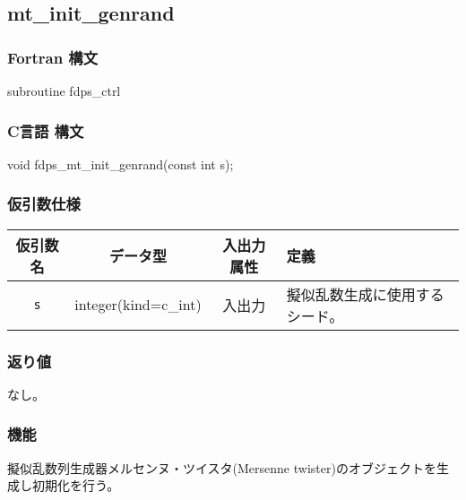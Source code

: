 \subsection{mt\_init\_genrand}
\subsubsection*{Fortran 構文}
\begin{screen}
\begin{spverbatim}
subroutine fdps_ctrl%
\end{spverbatim}
\end{screen}

\subsubsection*{C言語 構文}
\begin{screen}
\begin{spverbatim}
void fdps_mt_init_genrand(const int s);
\end{spverbatim}
\end{screen}

\subsubsection*{仮引数仕様}
\begin{table}[h]
\begin{tabularx}{\linewidth}{cccX}
\toprule
\rowcolor{Snow2}
仮引数名 & データ型 & 入出力属性 & 定義 \\
\midrule
\texttt{s} & integer(kind=c\_int) & 入出力 & 擬似乱数生成に使用するシード。\\
\bottomrule
\end{tabularx}
\end{table}

\subsubsection*{返り値}
なし。

\subsubsection*{機能}
擬似乱数列生成器メルセンヌ・ツイスタ(Mersenne twister)のオブジェクトを生成し初期化を行う。
\clearpage

